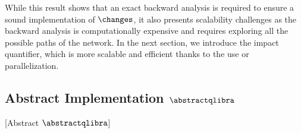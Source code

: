 While this result shows that an exact backward analysis is required to ensure a sound implementation of $\changes$, it also presents scalability challenges as the backward analysis is computationally expensive and requires exploring all the possible paths of the network.
In the next section, we introduce the \qlibraname{} impact quantifier, which is more scalable and efficient thanks to the use or parallelization.

\subsection{Abstract Implementation \texorpdfstring{$\abstractqlibra$}{Abstract QLibra}}[Abstract \texorpdfstring{$\abstractqlibra$}{QLibra}]






